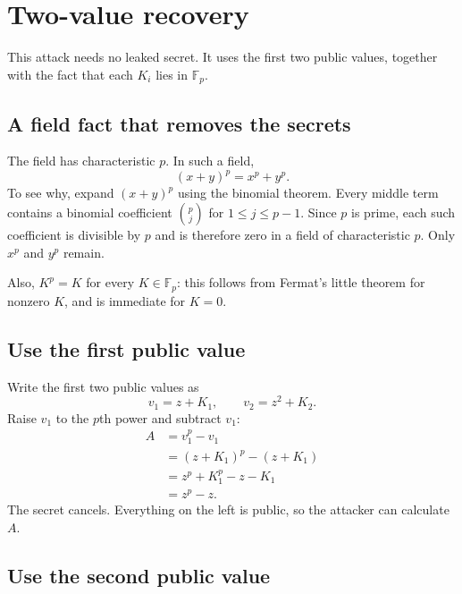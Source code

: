 \documentclass[11pt]{article}
\begin{document}
\section{Two-value recovery}

This attack needs no leaked secret. It uses the first two public values, together with the fact that each $K_i$ lies in $\mathbb F_p$.

\subsection{A field fact that removes the secrets}

The field has characteristic $p$. In such a field,
\begin{equation}
    (x+y)^p=x^p+y^p.
    \label{eq:frobenius}
\end{equation}
To see why, expand $(x+y)^p$ using the binomial theorem. Every middle term contains a binomial coefficient $\binom{p}{j}$ for $1\le j\le p-1$. Since $p$ is prime, each such coefficient is divisible by $p$ and is therefore zero in a field of characteristic $p$. Only $x^p$ and $y^p$ remain.

Also, $K^p=K$ for every $K\in\mathbb F_p$: this follows from Fermat's little theorem for nonzero $K$, and is immediate for $K=0$.

\subsection{Use the first public value}

Write the first two public values as
\[
    v_1=z+K_1,
    \qquad v_2=z^2+K_2.
\]
Raise $v_1$ to the $p$th power and subtract $v_1$:
\begin{align*}
    A&=v_1^p-v_1\\
     &=(z+K_1)^p-(z+K_1)\\
     &=z^p+K_1^p-z-K_1\\
     &=z^p-z.
\end{align*}
The secret cancels. Everything on the left is public, so the attacker can calculate $A$.

\subsection{Use the second public value}
\end{document}
